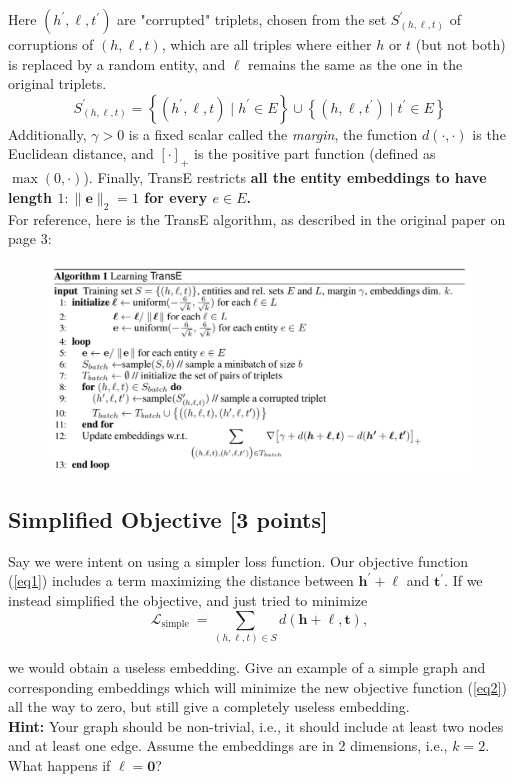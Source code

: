 \documentclass[11pt]{article}
\numberwithin{figure}{section}
\begin{document}
Here $\left(h^{\prime}, \ell, t^{\prime}\right)$ are "corrupted" triplets, chosen from the set $S_{(h, \ell, t)}^{\prime}$ of corruptions of $(h, \ell, t)$, which are all triples where either $h$ or $t$ (but not both) is replaced by a random entity, and $\ell$ remains the same as the one in the original triplets.
$$
S_{(h, \ell, t)}^{\prime}=\left\{\left(h^{\prime}, \ell, t\right) \mid h^{\prime} \in E\right\} \cup\left\{\left(h, \ell, t^{\prime}\right) \mid t^{\prime} \in E\right\}
$$
Additionally, $\gamma>0$ is a fixed scalar called the \textit{margin}, the function $d(\cdot, \cdot)$ is the Euclidean distance, and $[\cdot]_{+}$ is the positive part function (defined as $\max (0, \cdot)$). Finally, TransE restricts \textbf{all the entity embeddings to have length $1:\|\mathbf{e}\|_2=1$ for every $e \in E$.}\\
For reference, here is the TransE algorithm, as described in the original paper on page 3:
\begin{figure}[H]
    \centering
    \includegraphics[width=1.0\textwidth]{CS224W_Homework2/algo2.png}
    \label{fig:algo2}
\end{figure}

\subsection{Simplified Objective [3 points]}
Say we were intent on using a simpler loss function. Our objective function (\ref{eq1}) includes a term maximizing the distance between $\mathbf{h}^{\prime}+\boldsymbol{\ell}$ and $\mathbf{t}^{\prime}$. If we instead simplified the objective, and just tried to minimize
\begin{equation}\label{eq2}
\mathcal{L}_{\text {simple }}=\sum_{(h, \ell, t) \in S} d(\mathbf{h}+\boldsymbol{\ell}, \mathbf{t}),
\end{equation}

we would obtain a useless embedding. Give an example of a simple graph and corresponding embeddings which will minimize the new objective function (\ref{eq2}) all the way to zero, but still give a completely useless embedding.\\
\textbf{Hint:} Your graph should be non-trivial, i.e., it should include at least two nodes and at least one edge. Assume the embeddings are in 2 dimensions, i.e., $k = 2$.
What happens if $\boldsymbol{\ell} = \textbf{0}$?
\end{document}
